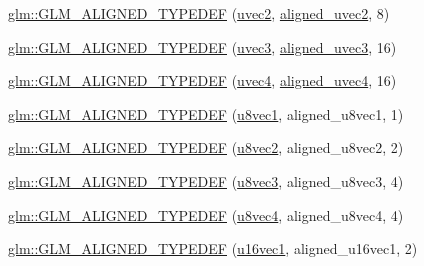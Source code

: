 \begin{DoxyCompactItemize}
\item 
\hyperlink{group__gtx__type__aligned_ga94e86186978c502c6dc0c0d9c4a30679}{glm\+::\+G\+L\+M\+\_\+\+A\+L\+I\+G\+N\+E\+D\+\_\+\+T\+Y\+P\+E\+D\+EF} (\hyperlink{group__core__types_gafd2041b45eff671aa8899d2c2835eee9}{uvec2}, \hyperlink{group__gtc__type__aligned_gacddd39189c2dedf7dd48c02155279124}{aligned\+\_\+uvec2}, 8)
\item 
\hyperlink{group__gtx__type__aligned_ga5cec574686a7f3c8ed24bb195c5e2d0a}{glm\+::\+G\+L\+M\+\_\+\+A\+L\+I\+G\+N\+E\+D\+\_\+\+T\+Y\+P\+E\+D\+EF} (\hyperlink{group__core__types_gac4ba593917841b859ba1683b8b52b8fa}{uvec3}, \hyperlink{group__gtc__type__aligned_ga5dee635ca69be0f5de5630a59d89034f}{aligned\+\_\+uvec3}, 16)
\item 
\hyperlink{group__gtx__type__aligned_ga47edfdcee9c89b1ebdaf20450323b1d4}{glm\+::\+G\+L\+M\+\_\+\+A\+L\+I\+G\+N\+E\+D\+\_\+\+T\+Y\+P\+E\+D\+EF} (\hyperlink{group__core__types_ga1c426d19627b32b14f0089f7f4ba7b1d}{uvec4}, \hyperlink{group__gtc__type__aligned_ga1e0792f3c64836e042ee3aad9bd8209c}{aligned\+\_\+uvec4}, 16)
\item 
\hyperlink{group__gtx__type__aligned_ga5611d6718e3a00096918a64192e73a45}{glm\+::\+G\+L\+M\+\_\+\+A\+L\+I\+G\+N\+E\+D\+\_\+\+T\+Y\+P\+E\+D\+EF} (\hyperlink{group__gtc__type__precision_ga5b0875b5979b80a0ccb371bf7f0f95d8}{u8vec1}, aligned\+\_\+u8vec1, 1)
\item 
\hyperlink{group__gtx__type__aligned_ga19837e6f72b60d994a805ef564c6c326}{glm\+::\+G\+L\+M\+\_\+\+A\+L\+I\+G\+N\+E\+D\+\_\+\+T\+Y\+P\+E\+D\+EF} (\hyperlink{group__gtc__type__precision_ga01e28d0272428f94d22ea6111f0112be}{u8vec2}, aligned\+\_\+u8vec2, 2)
\item 
\hyperlink{group__gtx__type__aligned_ga9740cf8e34f068049b42a2753f9601c2}{glm\+::\+G\+L\+M\+\_\+\+A\+L\+I\+G\+N\+E\+D\+\_\+\+T\+Y\+P\+E\+D\+EF} (\hyperlink{group__gtc__type__precision_gaa86b325e581afdc643495fbe428c1f1b}{u8vec3}, aligned\+\_\+u8vec3, 4)
\item 
\hyperlink{group__gtx__type__aligned_ga8b8588bb221448f5541a858903822a57}{glm\+::\+G\+L\+M\+\_\+\+A\+L\+I\+G\+N\+E\+D\+\_\+\+T\+Y\+P\+E\+D\+EF} (\hyperlink{group__gtc__type__precision_ga6c8841fa492bd5b1078b171452fd6974}{u8vec4}, aligned\+\_\+u8vec4, 4)
\item 
\hyperlink{group__gtx__type__aligned_ga991abe990c16de26b2129d6bc2f4c051}{glm\+::\+G\+L\+M\+\_\+\+A\+L\+I\+G\+N\+E\+D\+\_\+\+T\+Y\+P\+E\+D\+EF} (\hyperlink{group__gtc__type__precision_ga40d9e5ab8120f10efcfd7c88436c4a81}{u16vec1}, aligned\+\_\+u16vec1, 2)
\item 

\end{DoxyCompactItemize}
